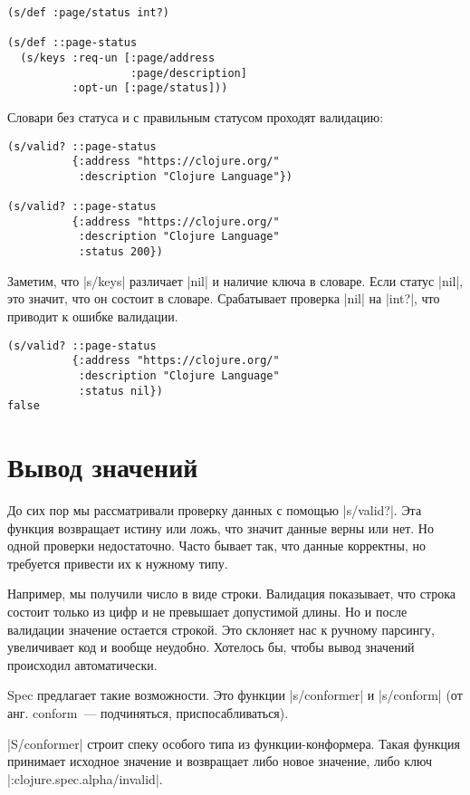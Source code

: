 \begin{verbatim}
(s/def :page/status int?)

(s/def ::page-status
  (s/keys :req-un [:page/address
                   :page/description]
          :opt-un [:page/status]))
\end{verbatim}

Словари без статуса и с правильным статусом проходят валидацию:

\begin{verbatim}
(s/valid? ::page-status
          {:address "https://clojure.org/"
           :description "Clojure Language"})

(s/valid? ::page-status
          {:address "https://clojure.org/"
           :description "Clojure Language"
           :status 200})
\end{verbatim}

Заметим, что \spverb|s/keys| различает \spverb|nil| и наличие ключа в словаре. Если статус
\spverb|nil|, это значит, что он состоит в словаре. Срабатывает проверка \spverb|nil| на
\spverb|int?|, что приводит к ошибке валидации.

\begin{verbatim}
(s/valid? ::page-status
          {:address "https://clojure.org/"
           :description "Clojure Language"
           :status nil})
false
\end{verbatim}

\section{Вывод значений}

До сих пор мы рассматривали проверку данных с помощью \spverb|s/valid?|. Эта функция
возвращает истину или ложь, что значит данные верны или нет. Но одной проверки
недостаточно. Часто бывает так, что данные корректны, но требуется привести их к
нужному типу.

Например, мы получили число в виде строки. Валидация показывает, что строка
состоит только из цифр и не превышает допустимой длины. Но и после валидации
значение остается строкой. Это склоняет нас к ручному парсингу, увеличивает код
и вообще неудобно. Хотелось бы, чтобы вывод значений происходил автоматически.

Spec предлагает такие возможности. Это функции \spverb|s/conformer| и \spverb|s/conform| (от
анг. conform~--- подчиняться, приспосабливаться).

\spverb|S/conformer| строит спеку особого типа из функции-конформера. Такая функция
принимает исходное значение и возвращает либо новое значение, либо ключ
\spverb|:clojure.spec.alpha/invalid|.

